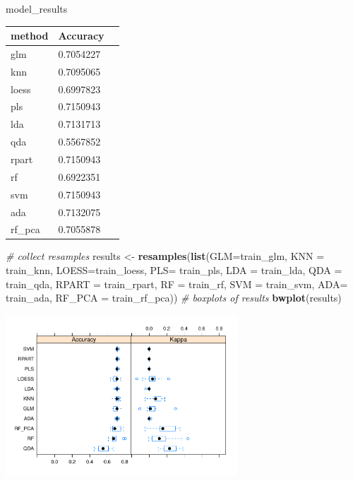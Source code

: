 \documentclass[]{article}
\newenvironment{Shaded}{\begin{snugshade}}{\end{snugshade}}
\newcommand{\CommentTok}[1]{\textcolor[rgb]{0.56,0.35,0.01}{\textit{#1}}}
\newcommand{\DataTypeTok}[1]{\textcolor[rgb]{0.13,0.29,0.53}{#1}}
\newcommand{\KeywordTok}[1]{\textcolor[rgb]{0.13,0.29,0.53}{\textbf{#1}}}
\newcommand{\NormalTok}[1]{#1}
\newcommand{\StringTok}[1]{\textcolor[rgb]{0.31,0.60,0.02}{#1}}
\begin{document}
\begin{Shaded}
\begin{Highlighting}[]
\NormalTok{model_results}
\end{Highlighting}
\end{Shaded}

\begin{center}
\begin{longtable}[c]{llr}
\toprule
method & Accuracy\tabularnewline
\midrule
\endhead
glm & 0.7054227\tabularnewline
knn & 0.7095065\tabularnewline
loess & 0.6997823\tabularnewline
pls & 0.7150943\tabularnewline
lda & 0.7131713\tabularnewline
qda & 0.5567852\tabularnewline
rpart & 0.7150943\tabularnewline
rf & 0.6922351\tabularnewline
svm & 0.7150943\tabularnewline
ada & 0.7132075\tabularnewline
rf\_pca & 0.7055878\tabularnewline
\bottomrule
\end{longtable}
\end{center}


\begin{Shaded}
\begin{Highlighting}[]
\CommentTok{# collect resamples}
\NormalTok{results <-}\StringTok{ }\KeywordTok{resamples}\NormalTok{(}\KeywordTok{list}\NormalTok{(}\DataTypeTok{GLM=}\NormalTok{train_glm, }
                          \DataTypeTok{KNN =}\NormalTok{ train_knn,}
                          \DataTypeTok{LOESS=}\NormalTok{train_loess,}
                          \DataTypeTok{PLS=}\NormalTok{ train_pls,}
                          \DataTypeTok{LDA =}\NormalTok{ train_lda,}
                          \DataTypeTok{QDA =}\NormalTok{ train_qda,}
                          \DataTypeTok{RPART =}\NormalTok{ train_rpart,}
                          \DataTypeTok{RF =}\NormalTok{ train_rf,}
                          \DataTypeTok{SVM =}\NormalTok{ train_svm,}
                          \DataTypeTok{ADA=}\NormalTok{ train_ada,}
                          \DataTypeTok{RF_PCA =}\NormalTok{ train_rf_pca))}
\CommentTok{# boxplots of results}
\KeywordTok{bwplot}\NormalTok{(results)}
\end{Highlighting}
\end{Shaded}

\begin{center}
\includegraphics[width=0.65\textwidth]{LiverDisease_files/figure-latex/unnamed-chunk-37-1.pdf}
\end{center}
\end{document}
